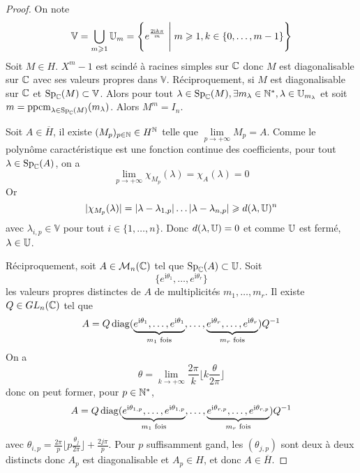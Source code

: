 \begin{proof}
	On note 
	\begin{equation}\mathbb{V}=\bigcup_{m\geqslant1}\mathbb{U}_{m}=\Biggl\{e^{\frac{2\mathrm{i}k\pi}{m}}\Biggm| m\geqslant1,k\in\{0,\dots,m-1\}\Biggr\}\end{equation}
	Soit $M\in H$. $X^{m}-1$ est scindé à racines simples sur $\mathbb{C}$ donc $M$ est diagonalisable sur $\mathbb{C}$ avec ses valeurs propres dans $\mathbb{V}$. Réciproquement, si $M$ est diagonalisable sur $\mathbb{C}$ et $\operatorname{Sp}_{\mathbb{C}}(M)\subset\mathbb{V}$. Alors pour tout $\lambda\in\operatorname{Sp}_{\mathbb{C}}(M),\exists m_{\lambda}\in\mathbb{N}^{*},\lambda\in\mathbb{U}_{m_{\lambda}}$ et soit $m=\operatorname{ppcm}\limits_{\lambda\in\operatorname{Sp}_{\mathbb{C}}(M)}(m_{\lambda})$. Alors $M^{m}=I_{n}$.

	Soit $A\in\overline{H}$, il existe $(M_{p})_{p\in\mathbb{N}}\in H^{\mathbb{N}}$ telle que $\lim\limits_{p\to+\infty}M_{p}=A$. Comme le polynôme caractéristique est une fonction continue des coefficients, pour tout $\lambda\in\operatorname{Sp}_{\mathbb{C}}(A)$, on a 
	\begin{equation}\lim\limits_{p\to+\infty}\chi_{M_{p}}(\lambda)=\chi_{A}(\lambda)=0\end{equation}
	Or 
	\begin{equation}\vert\chi_{M_{p}}(\lambda)\vert=\vert\lambda-\lambda_{1,p}\vert\dots\vert\lambda-\lambda_{n,p}\vert\geqslant d(\lambda,\mathbb{U})^{n}\end{equation}
	avec $\lambda_{i,p}\in\mathbb{V}$ pour tout $i\in\{1,\dots,n\}$. Donc $d(\lambda,\mathbb{U})=0$ et comme $\mathbb{U}$ est fermé, $\lambda\in\mathbb{U}$.

	Réciproquement, soit $A\in\mathcal{M}_{n}(\mathbb{C})$ tel que $\operatorname{Sp}_{\mathbb{C}}(A)\subset\mathbb{U}$. Soit 
	\begin{equation}\bigl\{e^{\mathrm{i}\theta_1},\dots,e^{\mathrm{i}\theta_r}\bigr\}\end{equation}
	les valeurs propres distinctes de $A$ de multiplicités $m_{1},\dots,m_{r}$. Il existe $Q\in GL_{n}(\mathbb{C})$ tel que 
	\begin{equation}A=Q\operatorname{diag}(\underbrace{e^{\mathrm{i}\theta_{1}},\dots,e^{\mathrm{i}\theta_1}}_{m_{1}\text{ fois}},\dots,\underbrace{e^{\mathrm{i}\theta_r},\dots,e^{\mathrm{i}\theta_r}}_{m_{r}\text{ fois}})Q^{-1}\end{equation}
	On a 
	\begin{equation}\theta=\lim\limits_{k\to+\infty}\frac{2\pi}{k}\lfloor k\frac{\theta}{2\pi}\rfloor\end{equation}
	donc on peut former, pour $p\in\mathbb{N}^{*}$,
	\begin{equation}A=Q\operatorname{diag}(\underbrace{e^{\mathrm{i}\theta_{1,p}},\dots,e^{\mathrm{i}\theta_{1,p}}}_{m_{1}\text{ fois}},\dots,\underbrace{e^{\mathrm{i}\theta_{r,p}},\dots,e^{\mathrm{i}\theta_{r,p}}}_{m_{r}\text{ fois}})Q^{-1}\end{equation}
	avec $\theta_{i,p}=\frac{2\pi}{p}\lfloor p\frac{\theta_{j}}{2\pi}\rfloor+\frac{2 j\pi}{p}$. Pour $p$ suffisamment gand, les $(\theta_{j,p})$ sont deux à deux distincts donc $A_{p}$ est diagonalisable et $A_{p}\in H$, et donc $A\in \overline{H}$.
\end{proof}

